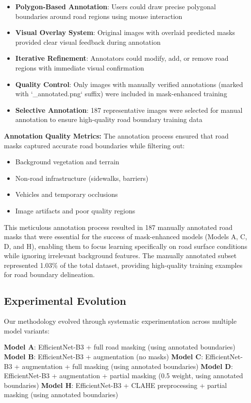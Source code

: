 \documentclass[12pt,twocolumn]{article}
\begin{document}
\begin{itemize}[itemsep=1pt,parsep=0pt,topsep=2pt]
\item \textbf{Polygon-Based Annotation}: Users could draw precise polygonal boundaries around road regions using mouse interaction
\item \textbf{Visual Overlay System}: Original images with overlaid predicted masks provided clear visual feedback during annotation
\item \textbf{Iterative Refinement}: Annotators could modify, add, or remove road regions with immediate visual confirmation
\item \textbf{Quality Control}: Only images with manually verified annotations (marked with `\_annotated.png` suffix) were included in mask-enhanced training
\item \textbf{Selective Annotation}: 187 representative images were selected for manual annotation to ensure high-quality road boundary training data
\end{itemize}

\textbf{Annotation Quality Metrics:}
The annotation process ensured that road masks captured accurate road boundaries while filtering out:
\begin{itemize}[itemsep=1pt,parsep=0pt,topsep=2pt]
\item Background vegetation and terrain
\item Non-road infrastructure (sidewalks, barriers)
\item Vehicles and temporary occlusions
\item Image artifacts and poor quality regions
\end{itemize}

This meticulous annotation process resulted in 187 manually annotated road masks that were essential for the success of mask-enhanced models (Models A, C, D, and H), enabling them to focus learning specifically on road surface conditions while ignoring irrelevant background features. The manually annotated subset represented 1.03\% of the total dataset, providing high-quality training examples for road boundary delineation.

\subsection{Experimental Evolution}

Our methodology evolved through systematic experimentation across multiple model variants:

\textbf{Model A}: EfficientNet-B3 + full road masking (using annotated boundaries)
\textbf{Model B}: EfficientNet-B3 + augmentation (no masks)  
\textbf{Model C}: EfficientNet-B3 + augmentation + full masking (using annotated boundaries)
\textbf{Model D}: EfficientNet-B3 + augmentation + partial masking (0.5 weight, using annotated boundaries)
\textbf{Model H}: EfficientNet-B3 + CLAHE preprocessing + partial masking (using annotated boundaries)
\end{document}
